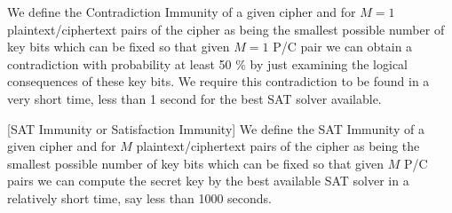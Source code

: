 \begin{mydef}
	We define the
	Contradiction Immunity of
	a given cipher
	and for $M=1$ plaintext/ciphertext pairs
	of the
	cipher as being
	the smallest possible
	number of key bits
	which can be fixed so that
	given $M=1$ P/C pair we
	can obtain a contradiction
	with probability at least
	50 $\%$ by just
	examining the logical consequences
	of these key bits.
	We require this contradiction
	to be found in a very short time,
	less than 1 second for
	the best SAT solver available.
\end{mydef}

\begin{mydef} \label{DEF:SAT_IMMUNITY}
	[SAT Immunity or Satisfaction Immunity]
	We define the
	SAT Immunity of
	a given cipher
	and for $M$ plaintext/ciphertext pairs
	of the
	cipher as
	being the smallest possible
	number of key bits
	which can be fixed so that
	given $M$ P/C pairs we
	can compute the secret key by
	the best available SAT solver in a relatively short time,
	say less than 1000 seconds.
\end{mydef}

